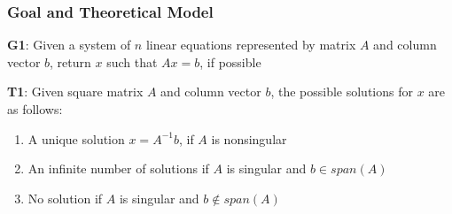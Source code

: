 \documentclass[t,12pt,numbers,fleqn]{beamer}
\begin{document}






\begin{frame}

\frametitle{Goal and Theoretical Model}

\textbf{G1}: Given a system of $n$
linear equations represented by matrix $A$ and column vector $b$, return $x$ such that $A x = b$, if possible

\textbf{T1}: Given square matrix $A$ and column vector $b$, the possible
solutions for $x$ are as follows:

\begin{enumerate}
\item A unique solution $x = A^{-1} b$, if $A$ is nonsingular
\item An infinite number of solutions if $A$ is singular and $b \in span(A)$
\item No solution if $A$ is singular and $b \notin span(A)$
\end{enumerate}

\end{frame}
\end{document}
